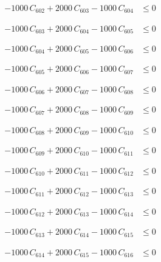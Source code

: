 \documentclass[a4paper,11pt]{article}
\begin{document}
\begin{align}
-1000\,C_{602} + 2000\,C_{603} - 1000\,C_{604} &\leq 0 \nonumber
\end{align}

\begin{align}
-1000\,C_{603} + 2000\,C_{604} - 1000\,C_{605} &\leq 0 \nonumber
\end{align}

\begin{align}
-1000\,C_{604} + 2000\,C_{605} - 1000\,C_{606} &\leq 0 \nonumber
\end{align}

\begin{align}
-1000\,C_{605} + 2000\,C_{606} - 1000\,C_{607} &\leq 0 \nonumber
\end{align}

\begin{align}
-1000\,C_{606} + 2000\,C_{607} - 1000\,C_{608} &\leq 0 \nonumber
\end{align}

\begin{align}
-1000\,C_{607} + 2000\,C_{608} - 1000\,C_{609} &\leq 0 \nonumber
\end{align}

\begin{align}
-1000\,C_{608} + 2000\,C_{609} - 1000\,C_{610} &\leq 0 \nonumber
\end{align}

\begin{align}
-1000\,C_{609} + 2000\,C_{610} - 1000\,C_{611} &\leq 0 \nonumber
\end{align}

\begin{align}
-1000\,C_{610} + 2000\,C_{611} - 1000\,C_{612} &\leq 0 \nonumber
\end{align}

\begin{align}
-1000\,C_{611} + 2000\,C_{612} - 1000\,C_{613} &\leq 0 \nonumber
\end{align}

\begin{align}
-1000\,C_{612} + 2000\,C_{613} - 1000\,C_{614} &\leq 0 \nonumber
\end{align}

\begin{align}
-1000\,C_{613} + 2000\,C_{614} - 1000\,C_{615} &\leq 0 \nonumber
\end{align}

\begin{align}
-1000\,C_{614} + 2000\,C_{615} - 1000\,C_{616} &\leq 0 \nonumber
\end{align}
\end{document}
